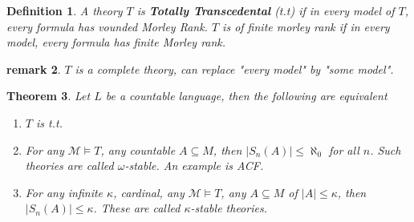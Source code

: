 \documentclass[letterpaper, 12pt]{article}
\newcommand{\fin}{\qquad \quad \hfill \framebox[1.75mm][l]{\,}}
\newcommand{\cM}{\mathcal{M}}
\theoremstyle{stdthm}
\newtheorem{thm}{Theorem}[section]
\theoremstyle{stddef}
\newtheorem{defn}[thm]{Definition}
\newtheorem{rem}[thm]{remark} %
\theoremstyle{stdnonum}
\theoremstyle{stdqands}
\theoremstyle{stdbold}
\begin{document}
\begin{defn}
A theory $T$ is {\bf Totally Transcedental} (t.t) if in every model of $T$, every formula has vounded Morley Rank. $T$ is of finite morley rank if in every model, every formula has finite Morley rank. 
\end{defn}

\begin{rem}
$T$ is a complete theory, can replace "every model" by "some model". 
\end{rem}

\begin{thm}
Let $L$ be a countable language, then the following are equivalent
\begin{enumerate}
\item $T$ is t.t.
\item For any $\cM \models T$, any countable $A \subseteq M$, then $|S_n(A)| \leq \aleph_0$ for all $n$. Such theories are called $\omega$-stable. An example is ACF. 
\item For any infinite $\kappa$, cardinal, any $\cM \models T$, any $A \subseteq M$ of $|A| \leq \kappa$, then $|S_n(A)| \leq \kappa$. These are called $\kappa$-stable theories. 
\end{enumerate}

\end{thm}
\end{document}
